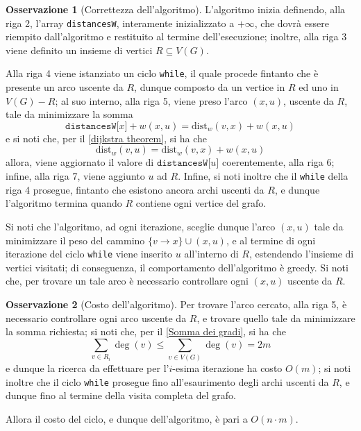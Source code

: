 \documentclass[14pt]{extreport}
\theoremstyle{definition}
\theoremstyle{definition}
\newtheorem{remark}{Osservazione}[subsection]
\begin{document}
\begin{remark}[Correttezza dell'algoritmo]
    L'algoritmo inizia definendo, alla riga 2, l'array \texttt{distancesW}, interamente inizializzato a $+ \infty$, che dovrà essere riempito dall'algoritmo e restituito al termine dell'esecuzione; inoltre, alla riga 3 viene definito un insieme di vertici $R \subseteq V(G)$.

    Alla riga 4 viene istanziato un ciclo \texttt{while}, il quale procede fintanto che è presente un arco uscente da $R$, dunque composto da un vertice in $R$ ed uno in $V(G) - R$; al suo interno, alla riga 5, viene preso l'arco $(x, u)$, uscente da $R$, tale da minimizzare la somma $$\texttt{distancesW[}x\texttt{]} + w(x, u) = \mathrm{dist}_w(v, x) + w(x, u)$$ e si noti che, per il \cref{dijkstra theorem}, si ha che $$\mathrm{dist}_w(v, u) = \mathrm{dist}_w(v, x) + w(x, u)$$ allora, viene aggiornato il valore di $\texttt{distancesW[}u\texttt{]}$ coerentemente, alla riga 6; infine, alla riga 7, viene aggiunto $u$ ad $R$. Infine, si noti inoltre che il \texttt{while} della riga 4 prosegue, fintanto che esistono ancora archi uscenti da $R$, e dunque l'algoritmo termina quando $R$ contiene ogni vertice del grafo.

    Si noti che l'algoritmo, ad ogni iterazione, sceglie dunque l'arco $(x, u)$ tale da minimizzare il peso del cammino $\{v \rightarrow x\} \cup (x, u)$, e al termine di ogni iterazione del ciclo \texttt{while} viene inserito $u$ all'interno di $R$, estendendo l'insieme di vertici visitati; di conseguenza, il comportamento dell'algoritmo è greedy. Si noti che, per trovare un tale arco è necessario controllare ogni $(x, u)$ uscente da $R$.
\end{remark}

\begin{remark}[Costo dell'algoritmo]
    Per trovare l'arco cercato, alla riga 5, è necessario controllare ogni arco uscente da $R$, e trovare quello tale da minimizzare la somma richiesta; si noti che, per il \cref{Somma dei gradi}, si ha che $$\displaystyle \sum_{v \in R_i}{\deg(v)} \le \sum_{v \in V(G)}{\deg(v)} = 2m$$ e dunque la ricerca da effettuare per l'$i$-esima iterazione ha costo $O(m)$; si noti inoltre che il ciclo \texttt{while} prosegue fino all'esaurimento degli archi uscenti da $R$, e dunque fino al termine della visita completa del grafo.

    Allora il costo del ciclo, e dunque dell'algoritmo, è pari a $O(n \cdot m)$.
\end{remark}
\end{document}
